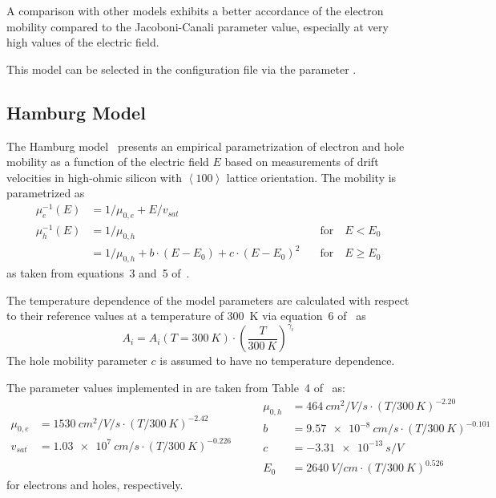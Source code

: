 A comparison with other models exhibits a better accordance of the electron mobility compared to the Jacoboni-Canali parameter value, especially at very high values of the electric field.

This model can be selected in the configuration file via the parameter .

\subsection{Hamburg Model}

The Hamburg model~\cite{hamburg} presents an empirical parametrization of electron and hole mobility as a function of the electric field $E$ based on measurements of drift velocities in high-ohmic silicon with $\left<100\right>$ lattice orientation.
The mobility is parametrized as
\begin{align}
    \label{eq:mob:ham}
    \mu_e^{-1}(E) &= 1 / \mu_{0,e} + E / v_{sat} \nonumber \\
    \mu_h^{-1}(E) &= 1 / \mu_{0,h} &\quad \textrm{for} \quad E < E_0 \nonumber \\
                  &= 1 / \mu_{0,h} + b \cdot (E - E_0) + c \cdot (E - E_0)^2 &\quad \textrm{for} \quad E \geq E_0
\end{align}
as taken from equations~3 and~5 of~\cite{hamburg}.

The temperature dependence of the model parameters are calculated with respect to their reference values at a temperature of \SI{300}{K} via equation~6 of~\cite{hamburg} as
\begin{equation}
    \label{eq:mob:ham:temp}
    A_i = A_i(T = \SI{300}{K}) \cdot \left(\frac{T}{\SI{300}{K}}\right)^{\gamma_i}
\end{equation}
The hole mobility parameter $c$ is assumed to have no temperature dependence.

The parameter values implemented in \apsq are taken from Table~4 of~\cite{hamburg} as:
\begin{equation*}
    \begin{split}
        \mu_{0,e} &= \SI{1530}{cm^2 \per V \per s} \cdot (T / \SI{300}{K})^{-2.42}\\
        v_{sat}   &= \SI{1.03e7}{cm \per s} \cdot (T / \SI{300}{K})^{-0.226}\\
    \end{split}
    \qquad
    \begin{split}
      \mu_{0,h} &= \SI{464}{cm^2 \per V \per s} \cdot (T / \SI{300}{K})^{-2.20}\\
        b       &= \SI{9.57e-8}{cm \per s} \cdot (T / \SI{300}{K})^{-0.101}\\
        c       &= \SI{-3.31e-13}{s \per V}\\
        E_0     &= \SI{2640}{V \per cm} \cdot (T / \SI{300}{K})^{0.526}
    \end{split}
\end{equation*}
for electrons and holes, respectively.

